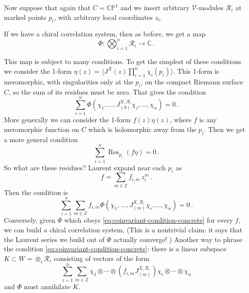 \documentclass[12pt,letterpaper,reqno]{amsart}
\numberwithin{equation}{section}
\newcommand{\bbC}{\ensuremath{\mathbb C}}
\newcommand{\bbP}{\ensuremath{\mathbb P}}
\newcommand{\bbZ}{\ensuremath{\mathbb Z}}
\newcommand{\vertex}{\mathcal{V}}
\newcommand{\vrep}{\mathcal{R}}
\newcommand{\IP}[1]{\langle#1\rangle}
\DeclareMathOperator{\Res}{Res}
\DeclareRobustCommand{\fixme}[1]{\leavevmode{\color{orange}[#1]}}
\begin{document}
\begin{example}
Now suppose that again that $C = \bbC \bbP^1$ and we insert arbitrary $\vertex$-modules $\vrep_i$ at marked points $p_i$,
with arbitrary local coordinates $z_i$.

If we have a chiral correlation system, then as before, we get a map
\begin{equation}
 \Phi: \bigotimes_{i=1}^n \vrep_i \to \bbC \, . 
\end{equation}

This map is subject to many conditions. To get the simplest of these conditions we consider
the 1-form $\eta(z) = \IP{J^X(z) \prod_{i=1}^n \chi_i(p_i)}$. This 1-form is meromorphic, with singularities only at the $p_i$,
on the compact Riemann surface $C$, so the sum of its residues must be zero. That gives the condition
\begin{equation} \label{eq:coinvariant-condition-zero-modes}
  \sum_{i=1}^n \Phi(\chi_1, \dots, J^{X,\vrep_i}_{(0)} \chi_i, \dots, \chi_n) = 0 \, .
\end{equation}
More generally we can consider the 1-form $f(z) \eta(z)$, where $f$ is any meromorphic function on $C$ which is holomorphic
away from the $p_i$. Then we get a more general condition
\begin{equation}
  \sum_{i=1}^n \Res_{p_i} (f \eta) = 0 \, .
\end{equation}
So what are these residues? Laurent expand near each $p_i$ as
\begin{equation}
  f = \sum_{m \in \bbZ} f_{i,m}\, z_i^{m} \, .
\end{equation}
Then the condition is
\begin{equation} \label{eq:coinvariant-condition-concrete}
  \sum_{i=1}^n \sum_{m \in \bbZ} f_{i,m} \Phi(\chi_1, \dots, J^{X,\vrep_i}_{(m)} \chi_i, \dots, \chi_n) = 0 \, .
\end{equation}
Conversely, given $\Phi$ which obeys \eqref{eq:coinvariant-condition-concrete} for every $f$, we can build a chiral correlation system.
(This is a nontrivial claim: it says that the Laurent series we build out of $\Phi$ actually converge! \fixme{...})
Another way to phrase the condition \eqref{eq:coinvariant-condition-concrete}: 
there is a linear subspace $K \subset W = \otimes_i \vrep_i$ 
consisting of vectors of the form 
\begin{equation}
  \sum_{i=1}^n \sum_{m \in \bbZ} \chi_1 \otimes \cdots \otimes (f_{i,m} J^{X,\vrep_i}_{(m)}) \chi_i \otimes \cdots \otimes \chi_n
\end{equation}
and $\Phi$ must annihilate $K$.


\end{example}
\end{document}
